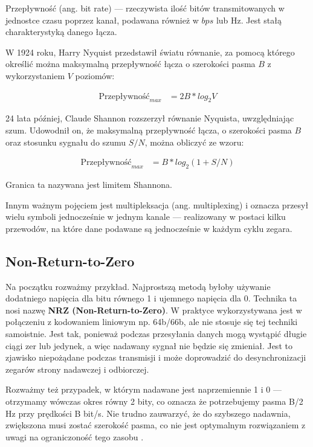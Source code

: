 Przepływność (ang. bit rate) --- rzeczywista ilość bitów transmitowanych w jednostce czasu poprzez kanał, podawana również w $bps$ lub Hz. Jest stałą charakterystyką danego łącza.

W 1924 roku, Harry Nyquist przedstawił światu równanie, za pomocą którego określić można maksymalną przepływność łącza o szerokości pasma $B$ z wykorzystaniem $V$ poziomów:

\begin{align*}
    \text{Przepływność}_{max} &= 2B * log_{2}{V}
\end{align*}

24 lata później, Claude Shannon rozszerzył równanie Nyquista, uwzględniając szum. Udowodnił on, że maksymalną przepływność łącza, o szerokości pasma $B$ oraz stosunku sygnału do szumu $S/N$, można
obliczyć ze wzoru:

\begin{align*}
    \text{Przepływność}_{max} &= B * log_{2}{(1 + S/N)}
\end{align*}

Granica ta nazywana jest limitem Shannona.

Innym ważnym pojęciem jest multipleksacja (ang. multiplexing) i oznacza przesył wielu symboli jednocześnie w jednym kanale --- realizowany w postaci kilku przewodów, na które dane podawane są jednocześnie w każdym cyklu zegara.

\subsection{Non-Return-to-Zero}

Na początku rozważmy przykład. Najprostszą metodą byłoby używanie dodatniego napięcia dla bitu równego 1 i ujemnego napięcia dla 0.
Technika ta nosi nazwę \textbf{NRZ (Non-Return-to-Zero)}.
W praktyce wykorzystywana jest w połączeniu z kodowaniem liniowym np. 64b/66b, ale nie stosuje się tej techniki samoistnie.
Jest tak, ponieważ podczas przesyłania danych mogą wystąpić długie ciągi zer lub jedynek, a więc nadawany sygnał nie będzie się zmieniał.
Jest to zjawisko niepożądane podczas transmisji i może doprowadzić do desynchronizacji zegarów strony nadawczej i odbiorczej.

Rozważmy też przypadek, w którym nadawane jest naprzemiennie 1 i 0 --- otrzymamy wówczas okres równy 2 bity, co oznacza że potrzebujemy pasma B/2 Hz przy prędkości B bit/s.
Nie trudno zauwarzyć, że do szybszego nadawnia, zwiększona musi zostać szerokość pasma, co nie jest optymalnym rozwiązaniem z uwagi na ograniczoność tego zasobu \cite{Computer-networks-Tanenbaum}.

